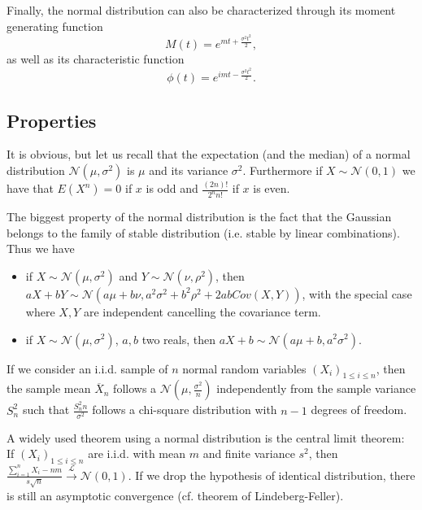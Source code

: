 Finally, the normal distribution can also be characterized through its moment generating function
$$
M(t) = e^{mt + \frac{\sigma^2t^2}{2}},
$$
as well as its characteristic function
$$
\phi(t) = e^{imt - \frac{\sigma^2t^2}{2}}.
$$

\subsection{Properties}
It is obvious, but let us recall that the expectation (and the median) of a normal distribution $ \mathcal N(\mu, \sigma^2)$ is $\mu$ and its variance $\sigma^2$. Furthermore if $X\sim \mathcal N(0, 1)$ we have that $E(X^n) = 0$ if $x$ is odd and $\frac{(2n)!}{2^n n!}$ if $x$ is even.



The biggest property of the normal distribution is the fact that the Gaussian belongs to the family of stable distribution (i.e. stable by linear combinations). Thus we have
\begin{itemize}
\item if $X\sim \mathcal N(\mu, \sigma^2)$ and $Y\sim \mathcal N(\nu, \rho^2)$, then $aX+bY\sim\mathcal N(a\mu+b\nu, a^2\sigma^2+b^2\rho^2+2abCov(X,Y))$, with the special case where $X,Y$ are independent cancelling the covariance term.
\item if $X\sim \mathcal N(\mu, \sigma^2)$, $a,b$ two reals, then $aX+b\sim \mathcal N(a\mu+b, a^2\sigma^2)$.
\end{itemize}

If we consider an i.i.d. sample of $n$ normal random variables $(X_i)_{1\leq i\leq n}$, then the sample mean $\overline X_n$ follows a $\mathcal N(\mu, \frac{\sigma^2}{n})$ independently from the sample variance $S^2_n$ such that $\frac{S_n^2 n}{\sigma^2}$ follows a chi-square distribution with $n-1$ degrees of freedom.

A widely used theorem using a normal distribution is the central limit theorem:\\
If $(X_i)_{1\leq i\leq n}$ are i.i.d. with mean $m$ and finite variance $s^2$, then
$\frac{\sum_{i=1}^n X_i - nm}{s\sqrt{n}} \stackrel{\mathcal L}{\longrightarrow} \mathcal N(0,1)$. If we drop the hypothesis of identical distribution, there is still an asymptotic convergence (cf. theorem of Lindeberg-Feller).


